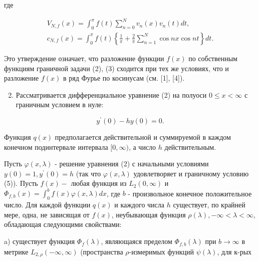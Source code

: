 \documentclass[10pt]{article}
\begin{document}
где



\[

\begin{gathered}

V_{N, f}(x)=\int_{0}^{\pi} f(t) \sum_{n=0}^{N} v_{n}(x) v_{n}(t) d t, \\

c_{N, f}(x)=\int_{0}^{\pi} f(t)\left\{\frac{1}{\pi}+\frac{2}{\pi} \sum_{n=1}^{N} \cos n x \cos n t\right\} d t .

\end{gathered}

\]



Это утверждение означает, что разложение функции $f(x)$ по собственным функциям граничной задачи (2), (3) сходится при тех же условиях, что и разложение $f(x)$ в ряд Фурье по косинусам (см. [1], [4]).



\begin{enumerate}

  \setcounter{enumi}{1}

  \item Рассматривается дифференциальное уравнение (2) на полуоси $0 \leqslant x<\infty$ с граничным условием в нуле:

\end{enumerate}



\[

y^{\prime}(0)-h y(0)=0 .

\]



Функция $q(x)$ предполагается действительной и суммируемой в каждом конечном подинтервале интервала $[0, \infty)$, а число $h$ действительным.



Пусть $\varphi(x, \lambda)$ - решение уравнения (2) с начальными условиями $y(0)=1, y^{\prime}(0)=h$ (так что $\varphi(x, \lambda)$ удовлетворяет и граничному условию (5)). Пусть $f(x)-$ любая функция из $L_{2}(0, \infty)$ и $\Phi_{f, b}(x)=\int_{0}^{b} f(x) \varphi(x, \lambda) d x$, где $b$ - произвольное конечное положительное число. Для каждой функции $q(x)$ и каждого числа $h$ существует, по крайней мере, одна, не зависящая от $f(x)$, неубывающая функция $\rho(\lambda),-\infty<\lambda<\infty$, обладающая следующими свойствами:



a) существует функция $\Phi_{f}(\lambda)$, являющаяся пределом $\Phi_{f, b}(\lambda)$ при $b \rightarrow \infty$ в метрике $L_{2, \rho}(-\infty, \infty)$ (пространства $\rho$-измеримых функций $\psi(\lambda)$, для к-рых
\end{document}
